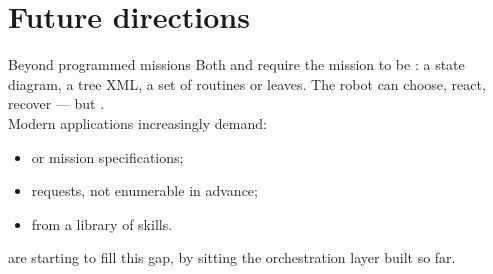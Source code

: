 
\section{Future directions}
\graphicspath{{figs/section3/}}

\begin{frame}{Beyond programmed missions}
  \justifying
  Both  and  require the mission to be : a state diagram, a tree XML, a set of routines or leaves. The robot can choose, react, recover --- but .\\
  \bigskip
  Modern applications increasingly demand:
  \begin{itemize}
    \item {} or  mission specifications;
    \item {} requests, not enumerable in advance;
    \item {} from a library of skills.
  \end{itemize}
  \bigskip
   are starting to fill this gap, by sitting  the orchestration layer built so far.
\end{frame}

